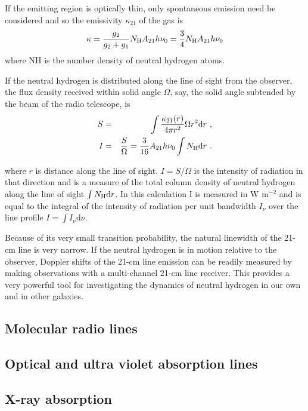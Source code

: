 \documentclass[12pt,a4paper]{article}
\newcommand{\dif}{\mathrm{d}}
\begin{document}
If the emitting region is optically thin, only spontaneous emission need be considered and so the emissivity $\kappa_{21}$ of the gas is
\begin{equation}
\kappa = \frac{g_2}{g_2+g_1} N_{\rm H} A_{21} h \nu_0 = \frac{3}{4} N_{\rm H} A_{21} h \nu_0
\end{equation}
where NH is the number density of neutral hydrogen atoms.

If the neutral hydrogen is distributed along the line of sight from the observer, the flux
density received within solid angle $\Omega$, say, the solid angle subtended by the beam of the radio telescope, is
\begin{eqnarray}
\nonumber S &=& \int \frac{\kappa_{21}(r)}{4\pi r^2} \Omega r^2 \dif r ~, \\
I &=& \frac{S}{\Omega} = \frac{3}{16} A_{21} h \nu_0 \int N_{\rm H} \dif r ~.
\end{eqnarray}

where $r$ is distance along the line of sight. $I = S/\Omega$  is the intensity of radiation in that direction and is a measure of the total column density of neutral hydrogen along the line of sight $\int N_{\rm H} \dif r$. In this calculation I is measured in W m$^{-2}$ and is equal to the integral of the intensity of radiation per unit bandwidth $I_\nu$ over the line profile $I = \int I_\nu \dif \nu$.
 
Because of its very small transition probability, the natural linewidth of the 21-cm line is very narrow. If the neutral hydrogen is in motion relative to the observer, Doppler shifts of the 21-cm line emission can be readily measured by making observations with a multi-channel 21-cm line receiver. This provides a very powerful tool for investigating the dynamics of neutral hydrogen in our own and in other galaxies.


\subsection{Molecular radio lines}


\subsection{Optical and ultra violet absorption lines}


\subsection{X-ray absorption}
\end{document}
